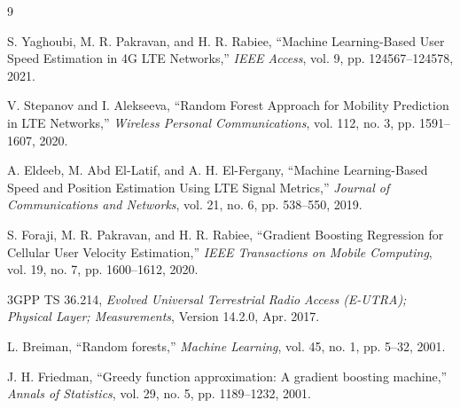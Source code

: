 \documentclass{CSICC}
\begin{document}
\begin{thebibliography}{9}

S. Yaghoubi, M. R. Pakravan, and H. R. Rabiee,
``Machine Learning-Based User Speed Estimation in 4G LTE Networks,''
\emph{IEEE Access}, vol. 9, pp. 124567--124578, 2021.

V. Stepanov and I. Alekseeva,
``Random Forest Approach for Mobility Prediction in LTE Networks,''
\emph{Wireless Personal Communications}, vol. 112, no. 3, pp. 1591--1607, 2020.

A. Eldeeb, M. Abd El-Latif, and A. H. El-Fergany,
``Machine Learning-Based Speed and Position Estimation Using LTE Signal Metrics,''
\emph{Journal of Communications and Networks}, vol. 21, no. 6, pp. 538--550, 2019.

S. Foraji, M. R. Pakravan, and H. R. Rabiee,
``Gradient Boosting Regression for Cellular User Velocity Estimation,''
\emph{IEEE Transactions on Mobile Computing}, vol. 19, no. 7, pp. 1600--1612, 2020.

3GPP TS 36.214,
\emph{Evolved Universal Terrestrial Radio Access (E-UTRA); Physical Layer; Measurements}, Version 14.2.0, Apr. 2017.

L. Breiman,
``Random forests,''
\emph{Machine Learning}, vol. 45, no. 1, pp. 5--32, 2001.

J. H. Friedman,
``Greedy function approximation: A gradient boosting machine,''
\emph{Annals of Statistics}, vol. 29, no. 5, pp. 1189--1232, 2001.

\end{thebibliography}
\end{document}
